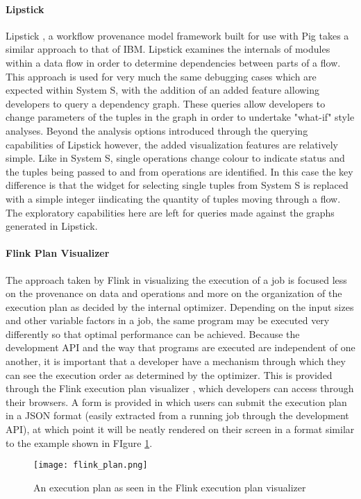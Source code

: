 \paragraph{Lipstick}
Lipstick \cite{Amsterdamer2011}, a workflow provenance model framework built for use with Pig takes a similar approach to that of IBM. Lipstick examines the internals of modules within a data flow in order to determine dependencies between parts of a flow. This approach is used for very much the same debugging cases which are expected within System S, with the addition of an added feature allowing developers to query a dependency graph. These queries allow developers to change parameters of the tuples in the graph in order to undertake "what-if" style analyses. Beyond the analysis options introduced through the querying capabilities of Lipstick however, the added visualization features are relatively simple. Like in System S, single operations change colour to indicate status and the tuples being passed to and from operations are identified. In this case the key difference is that the widget for selecting single tuples from System S is replaced with a simple integer iindicating the quantity of tuples moving through a flow. The exploratory capabilities here are left for queries made against the graphs generated in Lipstick.

\paragraph{Flink Plan Visualizer}
The approach taken by Flink in visualizing the execution of a job is focused less on the provenance on data and operations and more on the organization of the execution plan as decided by the internal optimizer. Depending on the input sizes and other variable factors in a job, the same program may be executed very differently so that optimal performance can be achieved. Because the development API and the way that programs are executed are independent of one another, it is important that a developer have a mechanism through which they can see the execution order as determined by the optimizer. This is provided through the Flink execution plan visualizer \cite{ApacheSoftwareFoundation2014}, which developers can access through their browsers. A form is provided in which users can submit the execution plan in a JSON format (easily extracted from a running job through the development API), at which point it will be neatly rendered on their screen in a format similar to the example shown in FIgure \ref{fig:flinkplan}.

\begin{figure}
	\centering
	\texttt{[image: flink\_plan.png]}
	\caption{An execution plan as seen in the Flink execution plan visualizer	\cite{ApacheSoftwareFoundation2014}}
	\label{fig:flinkplan}	
\end{figure}


